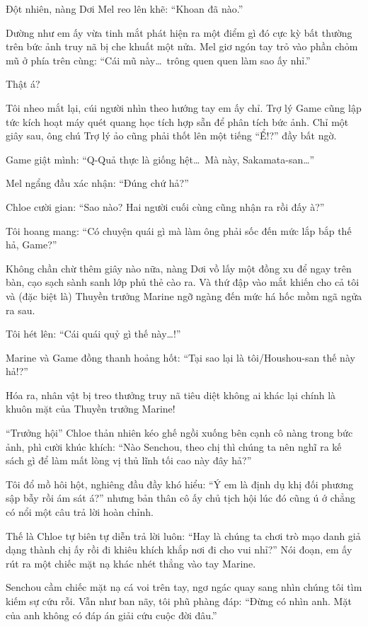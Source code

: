 \documentclass[../main.tex]{subfiles}
\begin{document}
Đột nhiên, nàng Dơi Mel reo lên khẽ: ``Khoan đã nào.''

Dường như em ấy vừa tinh mắt phát hiện ra một điểm gì đó cực kỳ bất thường trên bức ảnh truy nã bị che khuất một nửa. Mel giơ ngón tay trỏ vào phần chỏm mũ ở phía trên cùng: ``Cái mũ này\dots\ trông quen quen làm sao ấy nhỉ.''

Thật á?

Tôi nheo mắt lại, cúi người nhìn theo hướng tay em ấy chỉ. Trợ lý Game cũng lập tức kích hoạt máy quét quang học tích hợp sẵn để phân tích bức ảnh. Chỉ một giây sau, ông chú Trợ lý ảo cũng phải thốt lên một tiếng ``Ể!?'' đầy bất ngờ.

Game giật mình: ``Q-Quả thực là giống hệt\dots\ Mà này, Sakamata-san\dots''

Mel ngẩng đầu xác nhận: ``Đúng chứ hả?''

Chloe cười gian: ``Sao nào? Hai người cuối cùng cũng nhận ra rồi đấy à?''

Tôi hoang mang: ``Có chuyện quái gì mà làm ông phải sốc đến mức lắp bắp thế hả, Game?''

Không chần chừ thêm giây nào nữa, nàng Dơi vồ lấy một đồng xu để ngay trên bàn, cạo sạch sành sanh lớp phủ thẻ cào ra. Và thứ đập vào mắt khiến cho cả tôi và (đặc biệt là) Thuyền trưởng Marine ngỡ ngàng đến mức há hốc mồm ngã ngửa ra sau.

Tôi hét lên: ``Cái quái quỷ gì thế này\dots!''

Marine và Game đồng thanh hoảng hốt: ``Tại sao lại là tôi/Houshou-san thế này hả!?''

Hóa ra, nhân vật bị treo thưởng truy nã tiêu diệt không ai khác lại chính là khuôn mặt của Thuyền trưởng Marine!


``Trưởng hội'' Chloe thản nhiên kéo ghế ngồi xuống bên cạnh cô nàng trong bức ảnh, phì cười khúc khích: ``Nào Senchou, theo chị thì chúng ta nên nghĩ ra kế sách gì để làm mất lòng vị thủ lĩnh tối cao này đây hả?''

Tôi đổ mồ hôi hột, nghiêng đầu đầy khó hiểu: ``Ý em là định dụ khị đối phương sập bẫy rồi ám sát á?'' nhưng bản thân cô ấy chủ tịch hội lúc đó cũng ú ớ chẳng có nổi một câu trả lời hoàn chỉnh.

Thế là Chloe tự biên tự diễn trả lời luôn: ``Hay là chúng ta chơi trò mạo danh giả dạng thành chị ấy rồi đi khiêu khích khắp nơi đi cho vui nhỉ?'' Nói đoạn, em ấy rút ra một chiếc mặt nạ khác nhét thẳng vào tay Marine.

Senchou cầm chiếc mặt nạ cá voi trên tay, ngơ ngác quay sang nhìn chúng tôi tìm kiếm sự cứu rỗi. Vẫn như ban nãy, tôi phũ phàng đáp: ``Đừng có nhìn anh. Mặt của anh không có đáp án giải cứu cuộc đời đâu.''
\end{document}
